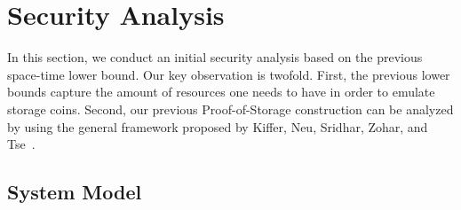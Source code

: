 \documentclass[conference]{IEEEtran}
\begin{document}









\section{Security Analysis}

In this section, we conduct an initial security analysis based on the previous space-time lower bound.
Our key observation is twofold. First, the previous lower bounds capture the amount of resources one needs 
to have in order to emulate storage coins. Second, our previous Proof-of-Storage construction can be analyzed
by using the general framework proposed by Kiffer, Neu, Sridhar, Zohar, and Tse~\cite{blockchain_capacity}.

\subsection{System Model}

\end{document}

